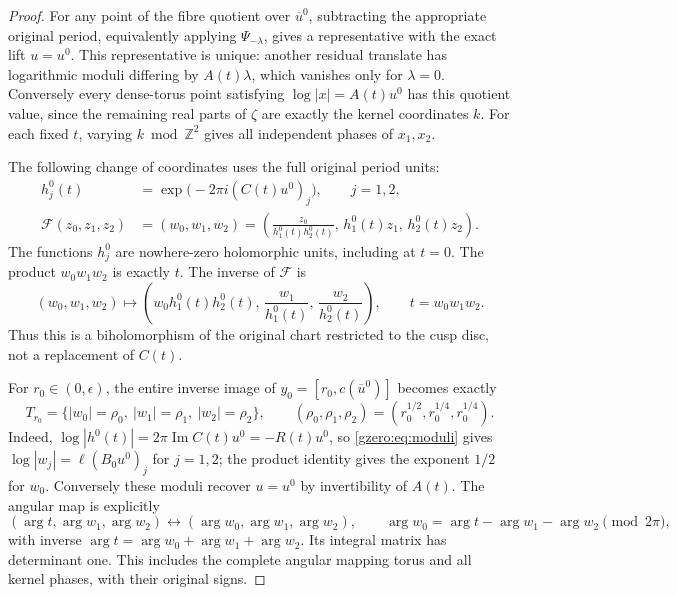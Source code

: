 \documentclass[11pt]{article}
\theoremstyle{definition}
\newcommand{\Z}{\mathbb Z}
\begin{document}
\begin{proof}
For any point of the fibre quotient over \(\overline u^0\), subtracting
the appropriate original period, equivalently applying
\(\Psi_{-\lambda}\), gives a representative with the exact lift
\(u=u^0\). This representative is unique: another residual translate
has logarithmic moduli differing by \(A(t)\lambda\), which vanishes
only for \(\lambda=0\). Conversely every dense-torus point satisfying
\(\log|x|=A(t)u^0\) has this quotient value, since the remaining real
parts of \(\zeta\) are exactly the kernel coordinates \(k\).
For each fixed \(t\), varying \(k\bmod\Z^2\) gives all independent
phases of \(x_1,x_2\).

The following change of coordinates uses the full original period units:
\begin{align}
 h_j^0(t)&=\exp\bigl(-2\pi i(C(t)u^0)_j\bigr),\qquad j=1,2,\\
 \mathcal F(z_0,z_1,z_2)
 &=(w_0,w_1,w_2)
 =\left(\frac{z_0}{h_1^0(t)h_2^0(t)},\,
 h_1^0(t)z_1,\,h_2^0(t)z_2\right).
 \label{gzero:eq:straightening}
\end{align}
The functions \(h_j^0\) are nowhere-zero holomorphic units, including
at \(t=0\). The product \(w_0w_1w_2\) is exactly \(t\).
The inverse of \(\mathcal F\) is
\[
 (w_0,w_1,w_2)\longmapsto
 \left(w_0h_1^0(t)h_2^0(t),\,
 \frac{w_1}{h_1^0(t)},\,\frac{w_2}{h_2^0(t)}\right),
 \qquad t=w_0w_1w_2.
\]
Thus this is a biholomorphism of the original chart restricted to the
cusp disc, not a replacement of \(C(t)\).

For \(r_0\in(0,\epsilon)\), the entire inverse image of
\(y_0=[r_0,c(\overline u^0)]\) becomes exactly
\begin{equation}
 T_{r_0}=
 \{|w_0|=\rho_0,\ |w_1|=\rho_1,\ |w_2|=\rho_2\},\qquad
 (\rho_0,\rho_1,\rho_2)=
 (r_0^{1/2},r_0^{1/4},r_0^{1/4}).
 \label{gzero:eq:torus}
\end{equation}
Indeed, \(\log|h^0(t)|=2\pi\operatorname{Im}C(t)u^0=-R(t)u^0\),
so \eqref{gzero:eq:moduli} gives \(\log|w_j|=\ell(B_0u^0)_j\) for
\(j=1,2\); the product identity gives the exponent \(1/2\) for
\(w_0\). Conversely these moduli recover \(u=u^0\) by invertibility
of \(A(t)\). The angular map is explicitly
\[
 (\arg t,\arg w_1,\arg w_2)\longleftrightarrow
 (\arg w_0,\arg w_1,\arg w_2),\qquad
 \arg w_0=\arg t-\arg w_1-\arg w_2\pmod{2\pi},
\]
with inverse \(\arg t=\arg w_0+\arg w_1+\arg w_2\).
Its integral matrix has determinant one. This includes the complete
angular mapping torus and all kernel phases, with their original signs.


\end{proof}
\end{document}

